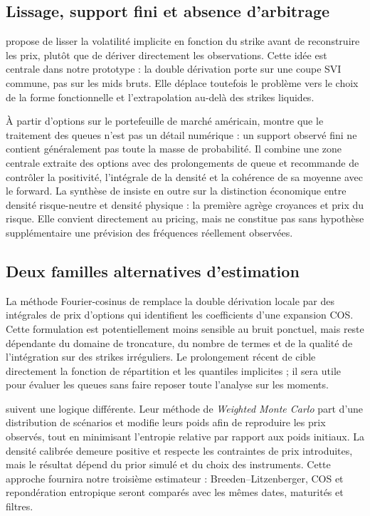 \documentclass[11pt,a4paper]{article}
\numberwithin{equation}{section}
\begin{document}
\subsection{Lissage, support fini et absence d'arbitrage}
\citet{shimko_1993} propose de lisser la volatilité implicite en fonction du strike
avant de reconstruire les prix, plutôt que de dériver directement les observations.
Cette idée est centrale dans notre prototype : la double dérivation porte sur une coupe
SVI commune, pas sur les mids bruts. Elle déplace toutefois le problème vers le choix de
la forme fonctionnelle et l'extrapolation au-delà des strikes liquides.

À partir d'options sur le portefeuille de marché américain, \citet{figlewski_2010}
montre que le traitement des queues n'est pas un détail numérique : un support observé
fini ne contient généralement pas toute la masse de probabilité. Il combine une zone
centrale extraite des options avec des prolongements de queue et recommande de contrôler
la positivité, l'intégrale de la densité et la cohérence de sa moyenne avec le forward.
La synthèse de \citet{figlewski_2018} insiste en outre sur la distinction économique
entre densité risque-neutre et densité physique : la première agrège croyances et prix
du risque. Elle convient directement au pricing, mais ne constitue pas sans hypothèse
supplémentaire une prévision des fréquences réellement observées.

\subsection{Deux familles alternatives d'estimation}
La méthode Fourier-cosinus de \citet{cui_yu_2021} remplace la double dérivation locale
par des intégrales de prix d'options qui identifient les coefficients d'une expansion
COS. Cette formulation est potentiellement moins sensible au bruit ponctuel, mais reste
dépendante du domaine de troncature, du nombre de termes et de la qualité de l'intégration
sur des strikes irréguliers. Le prolongement récent de \citet{cui_liu_yao_2025}
cible directement la fonction de répartition et les quantiles implicites ; il sera utile
pour évaluer les queues sans faire reposer toute l'analyse sur les moments.

\citet{avellaneda_et_al_2001} suivent une logique différente. Leur méthode de
\emph{Weighted Monte Carlo} part d'une distribution de scénarios et modifie leurs poids
afin de reproduire les prix observés, tout en minimisant l'entropie relative par rapport
aux poids initiaux. La densité calibrée demeure positive et respecte les contraintes de
prix introduites, mais le résultat dépend du prior simulé et du choix des instruments.
Cette approche fournira notre troisième estimateur : Breeden--Litzenberger, COS et
repondération entropique seront comparés avec les mêmes dates, maturités et filtres.
\end{document}
